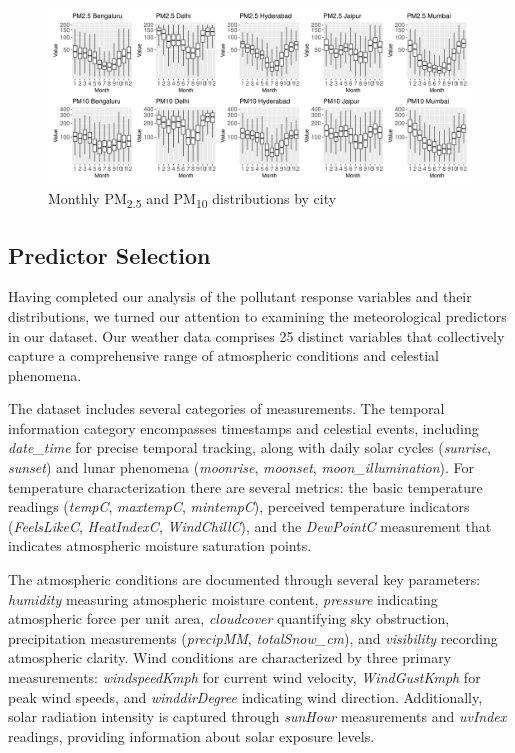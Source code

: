 \documentclass[twoside,11pt]{article}
\begin{document}
\begin{figure}[H]
  \centering
  \includegraphics[width=\textwidth]{assets/seasonal-trends.png}
  \caption{Monthly PM\textsubscript{2.5} and PM\textsubscript{10} distributions by city}
  \label{fig:seasonal_trends}
\end{figure}

\subsection{Predictor Selection}

Having completed our analysis of the pollutant response variables and their distributions, we turned our attention to examining the meteorological predictors in our dataset. Our weather data comprises 25 distinct variables that collectively capture a comprehensive range of atmospheric conditions and celestial phenomena.

The dataset includes several categories of measurements. The temporal information category encompasses timestamps and celestial events, including \textit{date\_time} for precise temporal tracking, along with daily solar cycles (\textit{sunrise}, \textit{sunset}) and lunar phenomena (\textit{moonrise}, \textit{moonset}, \textit{moon\_illumination}). For temperature characterization there are several metrics: the basic temperature readings (\textit{tempC}, \textit{maxtempC}, \textit{mintempC}), perceived temperature indicators (\textit{FeelsLikeC}, \textit{HeatIndexC}, \textit{WindChillC}), and the \textit{DewPointC} measurement that indicates atmospheric moisture saturation points.

The atmospheric conditions are documented through several key parameters: \textit{humidity} measuring atmospheric moisture content, \textit{pressure} indicating atmospheric force per unit area, \textit{cloudcover} quantifying sky obstruction, precipitation measurements (\textit{precipMM}, \textit{totalSnow\_cm}), and \textit{visibility} recording atmospheric clarity. Wind conditions are characterized by three primary measurements: \textit{windspeedKmph} for current wind velocity, \textit{WindGustKmph} for peak wind speeds, and \textit{winddirDegree} indicating wind direction. Additionally, solar radiation intensity is captured through \textit{sunHour} measurements and \textit{uvIndex} readings, providing information about solar exposure levels.
\end{document}
